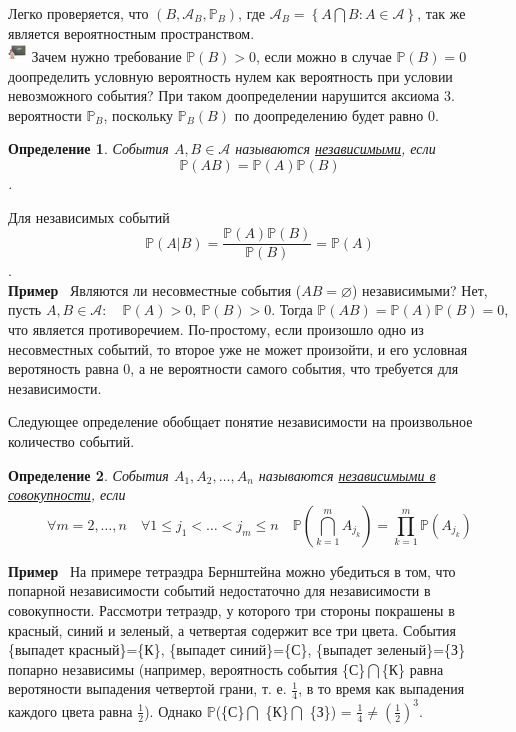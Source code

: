 \documentclass[12pt]{article}
\newtheorem{Def}{Определение}
\newenvironment{Ex}{{\bf Пример}\ }{}
\newenvironment{Wtf}{\includegraphics[height=5mm]{ping}}{}
\numberwithin{Th}{section}
\numberwithin{Def}{section}
\numberwithin{Lem}{section}
\numberwithin{St}{section}
\numberwithin{equation}{section}
\newcommand\Set[2]{\left\{ #1 \colon #2 \right\}}
\newcommand\Pro{\mathbb{P}} %
\newcommand\Ev{\mathscr{A}} %
\begin{document}
Легко проверяется, что $(B, \Ev_B, \Pro_B)$, где $\Ev_B = \Set{A \bigcap B}{A \in \Ev}$, так же является вероятностным пространством. \\
\begin{Wtf}
Зачем нужно требование $\Pro(B) > 0$, если можно в случае $\Pro(B) = 0$ доопределить условную вероятность нулем как вероятность при условии невозможного события?
При таком доопределении нарушится аксиома 3. вероятности $\Pro_B$, поскольку $\Pro_B(B)$ по доопределению будет равно $0$.
\end{Wtf}

\begin{Def}
События $A, B \in \Ev$ называются \underline{независимыми}, если $$\Pro(AB) = \Pro(A) \Pro(B)$$.
\end{Def}

Для независимых событий $$\Pro(A|B) = \frac{\Pro(A)\Pro(B)}{\Pro(B)} = \Pro(A)$$.\\
\begin{Ex}
Являются ли несовместные события ($AB = \varnothing$) независимыми? Нет, пусть  $A, B \in \Ev \colon \quad \Pro(A) > 0, \ \Pro(B) > 0$. Тогда $\Pro(AB) = \Pro(A)\Pro(B) = 0$, 
что является противоречием. По-простому, если произошло одно из несовместных событий, то второе уже не может произойти, и его условная веротяность равна 0, а не
вероятности самого события, что требуется для независимости.
\end{Ex}

Следующее определение обобщает понятие независимости на произвольное количество событий.
\begin{Def}
События $A_1, A_2, \dots, A_n$ называются \underline{независимыми в совокупности}, если 
$$\forall m = 2, \dots, n \quad \forall 1 \le j_1 < \ldots < j_m \le n \quad 
\Pro(\bigcap_{k=1}^{m}A_{j_k})=\prod_{k=1}^{m} \Pro(A_{j_k})$$
\end{Def}
\begin{Ex}
На примере тетраэдра Бернштейна можно убедиться в том, что попарной независимости событий недостаточно для независимости в совокупности. Рассмотри тетраэдр, у 
которого три стороны покрашены в красный, синий и зеленый, а четвертая содержит все три цвета. События \{выпадет красный\}=\{К\}, \{выпадет синий\}=\{С\}, \{выпадет зеленый\}=\{З\}
попарно независимы (например, вероятность события \{С\}$\bigcap$\{К\} равна веротяности выпадения четвертой грани, т. е. $\frac{1}{4}$, в то время как выпадения 
каждого цвета равна $\frac12$). Однако $\Pro$(\{С\}$\bigcap$ \{К\}$\bigcap$ \{З\}) = $\frac14 \not= (\frac12)^3$.
\end{Ex}
\newpage
\end{document}
